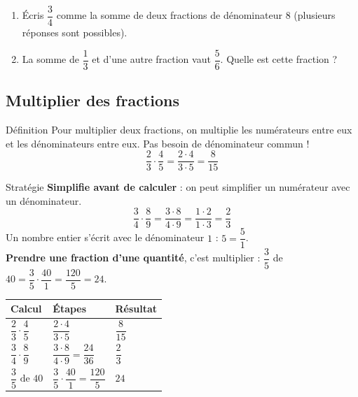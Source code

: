 \bigskip
{}
 
\begin{enumerate}[leftmargin=*,align=parleft, label=\alph*), itemsep=9pt]
\item Écris $\dfrac{3}{4}$ comme la somme de deux fractions de dénominateur $8$ (plusieurs réponses sont possibles).
\item La somme de $\dfrac{1}{3}$ et d'une autre fraction vaut $\dfrac{5}{6}$. Quelle est cette fraction ?
\end{enumerate}
 
 
\subsection{Multiplier des fractions}
 
\begin{regle}{Définition}
Pour \textcolor{themeColor}{multiplier} deux fractions, on multiplie les numérateurs entre eux et les dénominateurs entre eux. Pas besoin de dénominateur commun !
\[\dfrac{2}{3} \cdot \dfrac{4}{5}=\dfrac{2 \cdot 4}{3 \cdot 5}=\dfrac{8}{15}\]
\end{regle}
 
\vspace{20pt}
\begin{astuce}{Stratégie}
\textbf{Simplifie avant de calculer} : on peut simplifier un numérateur avec un dénominateur.
\[\dfrac{3}{4} \cdot \dfrac{8}{9}=\dfrac{3 \cdot 8}{4 \cdot 9}=\dfrac{1 \cdot 2}{1 \cdot 3}=\dfrac{2}{3}\]
Un nombre entier s'écrit avec le dénominateur $1$ : $5=\dfrac{5}{1}$.\\
\textbf{Prendre une fraction d'une quantité}, c'est multiplier : $\dfrac{3}{5}$ de $40=\dfrac{3}{5} \cdot \dfrac{40}{1}=\dfrac{120}{5}=24$.
\end{astuce}
 
\vspace{20pt}
\def\arraystretch{3}
\begin{tabularx}{\linewidth}{|>{\centering\arraybackslash}X|>{\centering\arraybackslash}X|>{\centering\arraybackslash}X|}
\hline
\cellcolor{themeNO!30}\textbf{Calcul} & \cellcolor{themeNO!30}\textbf{Étapes} & \cellcolor{themeNO!30}\textbf{Résultat} \\\hline
$\dfrac{2}{3}\cdot\dfrac{4}{5}$ & $\dfrac{2 \cdot 4}{3 \cdot 5}$ & $\dfrac{8}{15}$ \\\hline
$\dfrac{3}{4}\cdot\dfrac{8}{9}$ & $\dfrac{3 \cdot 8}{4 \cdot 9}=\dfrac{24}{36}$ & $\dfrac{2}{3}$ \\\hline
$\dfrac{3}{5}\text{ de }40$ & $\dfrac{3}{5}\cdot\dfrac{40}{1}=\dfrac{120}{5}$ & $24$ \\\hline
\end{tabularx}
\def\arraystretch{1}
 
